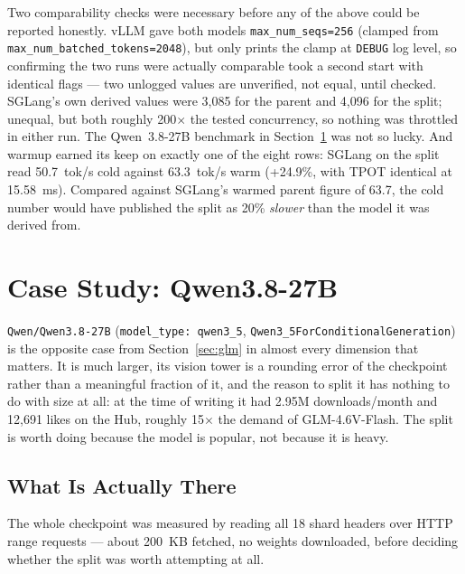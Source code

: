 \documentclass[11pt]{article}
\begin{document}
Two comparability checks were necessary before any of the above could be reported
honestly. vLLM gave both models \texttt{max\_num\_seqs=256} (clamped from
\texttt{max\_num\_batched\_tokens=2048}), but only prints the clamp at \texttt{DEBUG}
log level, so confirming the two runs were actually comparable took a second start with
identical flags --- two unlogged values are unverified, not equal, until checked.
SGLang's own derived values were 3,085 for the parent and 4,096 for the split; unequal,
but both roughly 200$\times$ the tested concurrency, so nothing was throttled in either
run. The Qwen~3.8-27B benchmark in Section~\ref{sec:qwen} was not so lucky. And warmup
earned its keep on exactly one of the eight rows: SGLang on the split read 50.7~tok/s
cold against 63.3~tok/s warm (+24.9\%, with TPOT identical at 15.58~ms). Compared
against SGLang's warmed parent figure of 63.7, the cold number would have published the
split as 20\% \emph{slower} than the model it was derived from.

\section{Case Study: Qwen3.8-27B}
\label{sec:qwen}

\texttt{Qwen/Qwen3.8-27B} (\texttt{model\_type: qwen3\_5},
\texttt{Qwen3\_5ForConditionalGeneration}) is the opposite case from
Section~\ref{sec:glm} in almost every dimension that matters. It is much larger, its
vision tower is a rounding error of the checkpoint rather than a meaningful fraction of
it, and the reason to split it has nothing to do with size at all: at the time of
writing it had 2.95M downloads/month and 12,691 likes on the Hub, roughly 15$\times$ the
demand of GLM-4.6V-Flash. The split is worth doing because the model is popular, not
because it is heavy.

\subsection{What Is Actually There}

The whole checkpoint was measured by reading all 18 shard headers over HTTP range
requests --- about 200~KB fetched, no weights downloaded, before deciding whether the
split was worth attempting at all.
\end{document}
